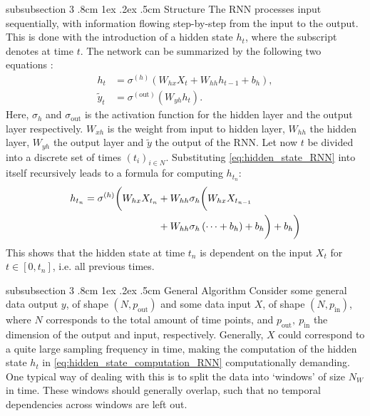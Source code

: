 \documentclass[%
reprint,
amsmath,amssymb,
aps,
]{revtex4-2}
\makeatletter
\renewcommand{\subsubsection}{%
	\@startsection
	{subsubsection}%
	{3}%
	{\z@}%
	{.8cm \@plus1ex \@minus .2ex}%
	{.5cm}%
	{\normalfont\small\centering}%
}
\makeatother
\begin{document}
\subsubsection{Structure}
The RNN processes input sequentially, with information flowing step-by-step from the input to the output. This is done with the introduction of a hidden state \(h_{t}\), where the subscript denotes at time \(t\). The network can be summarized by the following two equations \cite{tallec2017unbiasingtruncatedbackpropagationtime}:
\begin{subequations}
\begin{align}
	h_{t} &= \sigma^{(h)}\left(W_{hx}X_{t} + W_{hh}h_{t-1}  + b_{h}\right), \label{eq:hidden_state_RNN} \\
	\tilde{y}_{t} &= \sigma^{(\text{out})}\left(W_{yh}h_{t}\right).	\label{eq:output_RNN}
\end{align}
\end{subequations}
Here, \(\sigma_h\) and \(\sigma_{\text{out}}\) is the activation function for the hidden layer and the output layer respectively. \(W_{xh}\) is the weight from input to hidden layer, \(W_{hh}\) the hidden layer, \(W_{yh}\) the output layer and \(\tilde{y}\) the output of the RNN. Let now \(t\) be divided into a discrete set of times \((t_i)_{i\in N}\). Substituting \eqref{eq:hidden_state_RNN} into itself recursively leads to a formula for computing \(h_{t_n}\):
\begin{align}	\label{eq:hidden_state_computation_RNN}
	h_{t_n} = \sigma^{(h)}\biggl( W_{hx}X_{t_n} &+ W_{hh}\sigma_h \biggl( W_{hx}X_{t_{n-1}} \notag\\
	&+ W_{hh}\sigma_h \left(\dots + b_h\right) + b_h\biggr) 
	+b_h\biggr)
\end{align}
This shows that the hidden state at time \(t_n\) is dependent on the input \(X_{t}\) for \(t\in[0, t_n]\), i.e. all previous times. 

\subsubsection{General Algorithm}
Consider some general data output \(y\), of shape \((N, p_{\text{out}})\) and some data input \(X\), of shape \((N, p_{\text{in}})\), where \(N\) corresponds to the total amount of time points, and \(p_{\text{out}}, \ p_{\text{in}}\) the dimension of the output and input, respectively. Generally, \(X\) could correspond to a quite large sampling frequency in time, making the computation of the hidden state \(h_t\) in \eqref{eq:hidden_state_computation_RNN} computationally demanding. One typical way of dealing with this is to split the data into `windows' of size \(N_{W}\) in time. These windows should generally overlap, such that no temporal dependencies across windows are left out. 
\end{document}
